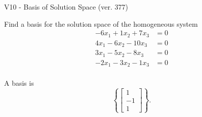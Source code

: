 \begin{exercise}
  \begin{exerciseTitle}V10 - Basis of Solution Space (ver. 377)\end{exerciseTitle}
  \begin{exerciseStatement}
    Find a basis for the solution space of the homogeneous system 
\begin{align*}
 -6 x_ 1 + 1 x_ 2 + 7 x_ 3 &= 0  \\ 
  4 x_ 1 -6 x_ 2 -10 x_ 3 &= 0  \\ 
  3 x_ 1 -5 x_ 2 -8 x_ 3 &= 0  \\ 
  -2 x_ 1 -3 x_ 2 -1 x_ 3 &= 0  \\ 
 \end{align*}


 
  \end{exerciseStatement}

  \begin{exerciseAnswer}
   A basis is   
\[\left\{\left[\begin{array}{c}
1 \\
-1 \\
1
\end{array}\right]\right\}.\]

  


  \end{exerciseAnswer}
\end{exercise}